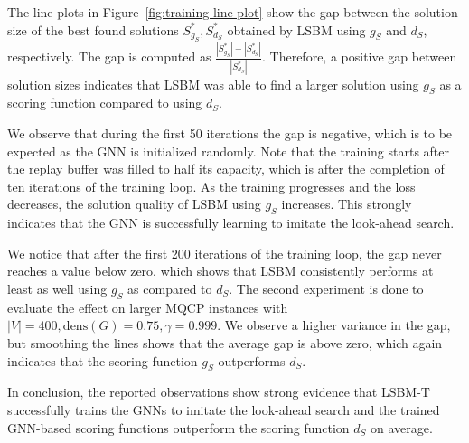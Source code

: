 \documentclass[draft,final]{vutinfth} %
\begin{document}
The line plots in Figure~\ref{fig:training-line-plot} show the gap between the solution size of the best found solutions $S^*_{g_S}, S^*_{d_S}$ obtained by LSBM using $g_S$ and $d_S$, respectively. The gap is computed as $ \frac{|S^*_{g_S}| - |S^*_{d_S}|}{|S^*_{d_S}|}$. Therefore, a positive gap between solution sizes indicates that LSBM was able to find a larger solution using $g_S$ as a scoring function compared to using $d_S$. 

We observe that during the first 50 iterations the gap is negative, which is to be expected as the GNN is initialized randomly. 
Note that the training starts after the replay buffer was filled to half its capacity, which is after the completion of ten iterations of the training loop. 
As the training progresses and the loss decreases, the solution quality of LSBM using $g_S$ increases. This strongly indicates that the GNN is successfully learning to imitate the look-ahead search. 

We notice that after the first 200 iterations of the training loop, the gap never reaches a value below zero, which shows that LSBM consistently performs at least as well using $g_S$ as compared to $d_S$. 
The second experiment is done to evaluate the effect on larger MQCP instances with $|V|=400, \mathrm{dens}(G)=0.75, \gamma=0.999$. We observe a higher variance in the gap, but smoothing the lines shows that the average gap is above zero, which again indicates that the scoring function $g_S$ outperforms $d_S$. 

In conclusion, the reported observations show strong evidence that LSBM-T successfully trains the GNNs to imitate the look-ahead search and the trained GNN-based scoring functions outperform the scoring function $d_S$ on average. 
\end{document}
